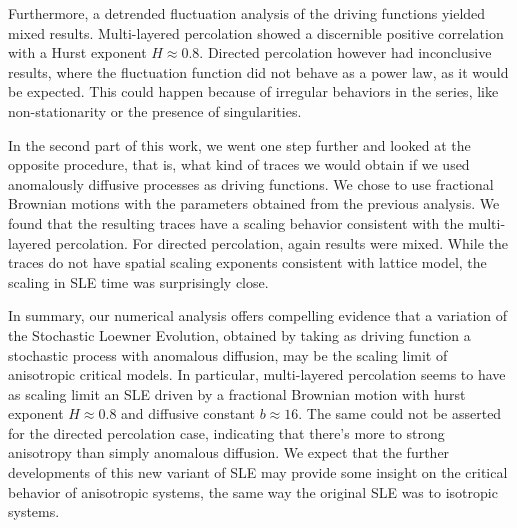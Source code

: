 Furthermore, a detrended fluctuation analysis of the driving functions yielded
mixed results. Multi-layered percolation showed a discernible positive
correlation with a Hurst exponent $H\approx0.8$. Directed percolation however
had inconclusive results, where the fluctuation function did not behave as a
power law, as it would be expected. This could happen because of irregular
behaviors in the series, like non-stationarity or the presence of
singularities.

In the second part of this work, we went one step further and looked at the
opposite procedure, that is, what kind of traces we would obtain if we used
anomalously diffusive processes as driving functions. We chose to use
fractional Brownian motions with the parameters obtained from the previous
analysis. We found that the resulting traces have a scaling behavior consistent
with the multi-layered percolation. For directed percolation, again results
were mixed. While the traces do not have spatial scaling exponents consistent
with lattice model, the scaling in SLE time was surprisingly close.

In summary, our numerical analysis offers compelling evidence that a variation
of the Stochastic Loewner Evolution, obtained by taking as driving function a
stochastic process with anomalous diffusion, may be the scaling limit of
anisotropic critical models. In particular, multi-layered percolation seems to
have as scaling limit an SLE driven by a fractional Brownian motion with hurst
exponent $H\approx0.8$ and diffusive constant $b\approx16$. The same could not
be asserted for the directed percolation case, indicating that there's more to
strong anisotropy than simply anomalous diffusion. We expect that the further
developments of this new variant of SLE may provide some insight on the
critical behavior of anisotropic systems, the same way the original SLE was to
isotropic systems.
